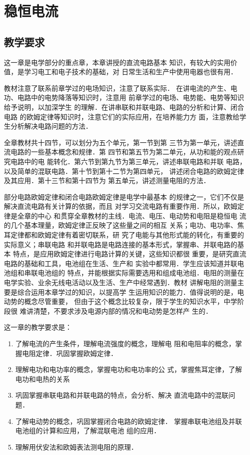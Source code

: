 \chapter{稳恒电流}\minitoc[n]
\section{教学要求}
这一章是电学部分的重点章，本章讲授的直流电路基本
知识，有较大的实用价值，是学习电工和电子技术的基础，对
日常生活和生产中使用电器也很有用．

教材注意了联系前章学过的电场知识，注意了联系实际．
在讲电流的产生、电功、电路中的电势降落等知识时，注意用
前章学过的电场、电势能、电势等知识给予说明，以加深学生
的理解．在讲串联和并联电路、电路的分析和计算、闭合电路
的欧姆定律等知识时，注意它们的实际应用，在培养能力方
面，注意教给学生分析解决电路问题的方法．

全章教材共十四节，可以划分为五个单元，第一节到第
三节为第一单元，讲述直流电路的一些基本概念和规律．第
四节和第五节为第二单元，从功和能的观点研究电路中的电
能转化．第六节到第九节为第三单元，讲述串联电路和并联
电路，以及简单的混联电路．第十节到第十二节为第四单元，
讲述闭合电路的欧姆定律及其应用．第十三节和第十四节为
第五单元，讲述测量电阻的方法．

部分电路欧姆定律和闭合电路欧姆定律是电学中最基本
的规律之一，它们不仅是解决直流电路有关计算的依据，而且
对学习交流电路有重要作用．所以，欧姆定律是全章的中心
和贯穿全章教材的主线．电流、电压、电动势和电阻是稳恒电
流的几个基本理量，欧姆定律正反映了这些量之间的相互
关系；电功、电功率、焦耳定律都和欧姆定律有着密切联系，研
究了电能与其他形式能的转化，有重要的实际意义；串联电路
和并联电路是电路连接的基本形式，掌握串、并联电路的基本
特点，是应用欧姆定律进行电路计算的关键，这些知识都很
重要，是研究直流电路的基础和工具，电池组在生活、生产和
实验中都常用．学生应该知道并联电池组和串联电池组的
特点，并能根据实际需要选用和组成电池组．电阻的测量在
电学实验、业余无线电活动以及生活、生产中经常遇到．教材
讲解电阻的测量主要是综合运用本章学过的知识，以提高学
生运用知识的能力．值得说明的是，电动势的概念尽管重要，
但由于这个概念比较复杂，限于学生的知识水平，中学阶段很
难讲清楚，不要求涉及电源内部的情况和电动势是怎样产
生的．

这一章的教学要求是：
\begin{enumerate}
\item 了解电流的产生条件，理解电流强度的概念，理解电
阻和电阻率的概念，掌握电阻定律．巩固掌握欧姆定律．
\item 理解电功和电功率的概念，掌握电功和电功率的公
式，掌握焦耳定律，了解电功和电热的关系
\item 巩固掌握串联电路和并联电路的特点，会分析、解决
直流电路中的混联问题．
\item 了解电动势的概念，巩固掌握闭合电路的欧姆定律．
掌握串联电池组及并联电池组的计算和应用，了解混联电池
组的应用．
\item 理解用伏安法和欧姆表法测电阻的原理．
\end{enumerate}

